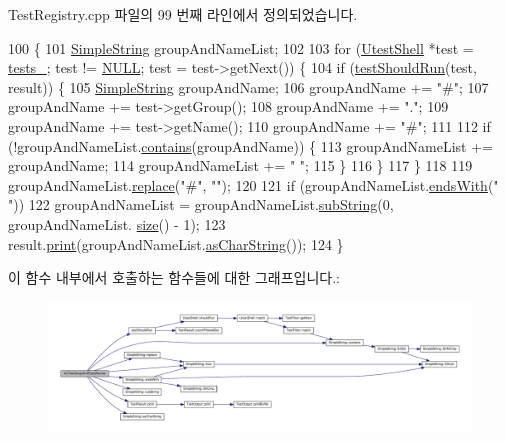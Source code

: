 Test\+Registry.\+cpp 파일의 99 번째 라인에서 정의되었습니다.


\begin{DoxyCode}
100 \{
101     \hyperlink{class_simple_string}{SimpleString} groupAndNameList;
102 
103     \textcolor{keywordflow}{for} (\hyperlink{class_utest_shell}{UtestShell} *test = \hyperlink{class_test_registry_ac25160ebe0919f203197a4c65a72b02e}{tests\_}; test != \hyperlink{openavb__types__base__pub_8h_a070d2ce7b6bb7e5c05602aa8c308d0c4}{NULL}; test = test->getNext()) \{
104         \textcolor{keywordflow}{if} (\hyperlink{class_test_registry_a1a8176b8ede17cf96ba1ed88dfa3bc0c}{testShouldRun}(test, result)) \{
105             \hyperlink{class_simple_string}{SimpleString} groupAndName;
106             groupAndName += \textcolor{stringliteral}{"#"};
107             groupAndName += test->getGroup();
108             groupAndName += \textcolor{stringliteral}{"."};
109             groupAndName += test->getName();
110             groupAndName += \textcolor{stringliteral}{"#"};
111 
112             \textcolor{keywordflow}{if} (!groupAndNameList.\hyperlink{class_simple_string_abdbf6fb985e8643e24d7035e830b7b00}{contains}(groupAndName)) \{
113                 groupAndNameList += groupAndName;
114                 groupAndNameList += \textcolor{stringliteral}{" "};
115             \}
116         \}
117     \}
118 
119     groupAndNameList.\hyperlink{class_simple_string_a432bd98f2897a79d54b8dd64de48247e}{replace}(\textcolor{stringliteral}{"#"}, \textcolor{stringliteral}{""});
120 
121     \textcolor{keywordflow}{if} (groupAndNameList.\hyperlink{class_simple_string_a96b82881ce1d49cee9ee0585bdf45ffb}{endsWith}(\textcolor{stringliteral}{" "}))
122         groupAndNameList = groupAndNameList.\hyperlink{class_simple_string_aa70337d05455667af5f0316572d76d40}{subString}(0, groupAndNameList.
      \hyperlink{class_simple_string_aac782da1f912bceb5d8ad00c8dc892ac}{size}() - 1);
123     result.\hyperlink{class_test_result_aeee8b15298e1baa2d0ced78c1fcb4b90}{print}(groupAndNameList.\hyperlink{class_simple_string_af7c0efaf31f42553f05719903c830be1}{asCharString}());
124 \}
\end{DoxyCode}


이 함수 내부에서 호출하는 함수들에 대한 그래프입니다.\+:
\nopagebreak
\begin{figure}[H]
\begin{center}
\leavevmode
\includegraphics[width=350pt]{class_test_registry_a3e4f592627c3d0d5dc10ceba9a4f370d_cgraph}
\end{center}
\end{figure}




